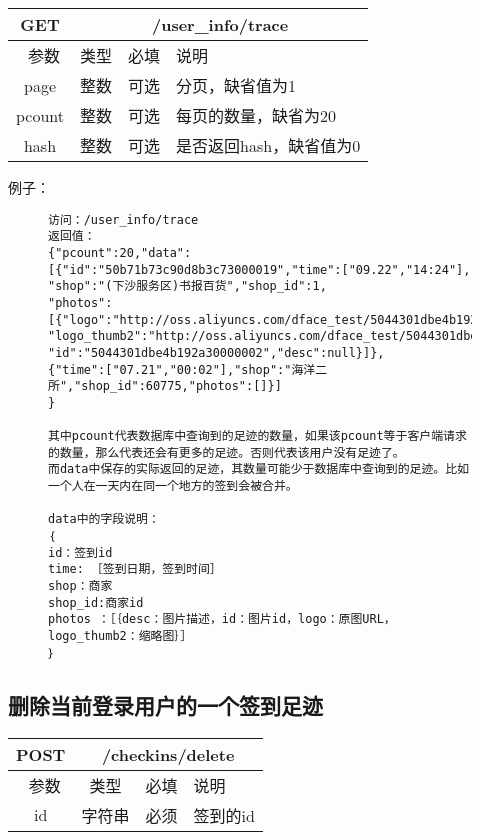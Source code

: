 \documentclass[cs4size]{ctexartutf8}
\begin{document}
\begin{table}[H]
   \begin{center}
\begin{tabular}{|c|c|c|p{12cm}|}
\hline
GET & \multicolumn{3}{|c|}{/user\_info/trace} \\
\hline\hline
 \  参数  & 类型 & 必填 &  说明  \\
   \hline
 page  & 整数 & 可选 & 分页，缺省值为1\\ 
 \hline
 pcount  & 整数 & 可选 & 每页的数量，缺省为20\\ 
  \hline
 hash  & 整数 & 可选 & 是否返回hash，缺省值为0\\
 \hline
\end{tabular}
   \end{center}
\end{table}

例子：

\begin{figure}[H]
\begin{verbatim}
访问：/user_info/trace
返回值：
{"pcount":20,"data":
[{"id":"50b71b73c90d8b3c73000019","time":["09.22","14:24"],
"shop":"(下沙服务区)书报百货","shop_id":1,
"photos":[{"logo":"http://oss.aliyuncs.com/dface_test/5044301dbe4b192a30000002/0.jpg",
"logo_thumb2":"http://oss.aliyuncs.com/dface_test/5044301dbe4b192a30000002/t2_0.jpg",
"id":"5044301dbe4b192a30000002","desc":null}]},
{"time":["07.21","00:02"],"shop":"海洋二所","shop_id":60775,"photos":[]}]
}

其中pcount代表数据库中查询到的足迹的数量，如果该pcount等于客户端请求的数量，那么代表还会有更多的足迹。否则代表该用户没有足迹了。
而data中保存的实际返回的足迹，其数量可能少于数据库中查询到的足迹。比如一个人在一天内在同一个地方的签到会被合并。

data中的字段说明：
｛
id：签到id
time: ［签到日期，签到时间］
shop：商家
shop_id:商家id
photos ：［｛desc：图片描述，id：图片id，logo：原图URL，logo_thumb2：缩略图｝］
｝

\end{verbatim}
\end{figure}



\subsection{删除当前登录用户的一个签到足迹}

\begin{table}[H]
   \begin{center}
\begin{tabular}{|c|c|c|p{12cm}|}
\hline
POST & \multicolumn{3}{|c|}{/checkins/delete} \\
\hline\hline
 \  参数  & 类型 & 必填 &  说明  \\
   \hline
 id  & 字符串 & 必须 & 签到的id\\ 
 \hline
\end{tabular}
   \end{center}
\end{table}
\end{document}
